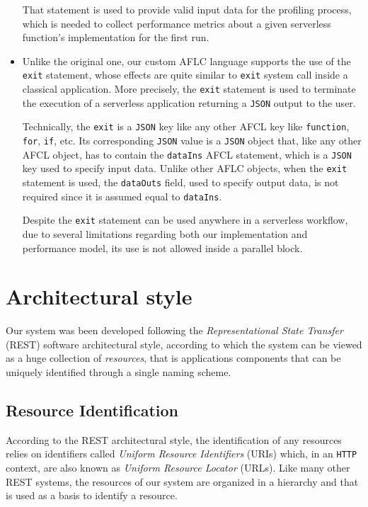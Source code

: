 \documentclass[12pt,a4paper]{report}
\begin{document}
\begin{itemize}
	That statement is used to provide valid input data for the profiling process, which is needed to collect performance metrics about a given serverless function's implementation for the first run.
	
	\item Unlike the original one, our custom AFLC language supports the use of the \texttt{exit} statement, whose effects are quite similar to \texttt{exit} system call inside a classical application. More precisely, the \texttt{exit} statement is used to terminate the execution of a serverless application returning a \texttt{JSON} output to the user. 
	
	Technically, the \texttt{exit} is a \texttt{JSON} key like any other AFCL key like \texttt{function}, \texttt{for}, \texttt{if}, etc. Its corresponding \texttt{JSON} value is a \texttt{JSON} object that, like any other AFCL object\cite{AFCL}, has to contain the \texttt{dataIns} AFCL statement, which is a \texttt{JSON} key used to specify input data\cite{AFCL}. Unlike other AFLC objects, when the \texttt{exit} statement is used, the \texttt{dataOuts} field, used to specify output data\cite{AFCL}, is not required since it is assumed equal to \texttt{dataIns}.  
	
	Despite the \texttt{exit} statement can be used anywhere in a serverless workflow, due to several limitations regarding both our implementation and performance model, its use is not allowed inside a parallel block.
	
\end{itemize}

\section{Architectural style}

Our system was been developed following the \textit{Representational State Transfer} (REST) software architectural style, according to which the system can be viewed as a huge collection of \textit{resources}, that is applications components that can be uniquely identified through a single naming scheme. 

\subsection{Resource Identification}

According to the REST architectural style, the identification of any resources relies on identifiers called \textit{Uniform Resource Identifiers} (URIs) which, in an \texttt{HTTP} context, are also known as \textit{Uniform Resource Locator} (URLs). Like many other REST systems, the resources of our system are organized in a hierarchy and that is used as a basis to identify a resource.
\end{document}
